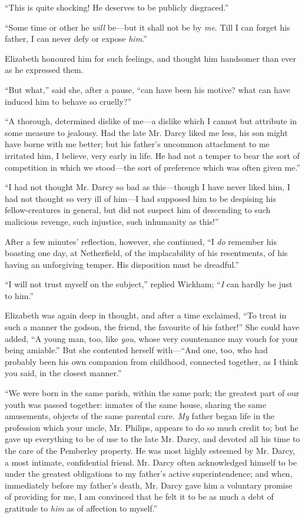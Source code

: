 ``This is quite shocking! He deserves to be publicly disgraced.''

``Some time or other he \textit{will} be---but it shall not be by \textit{me}. Till I can forget his father, I can never defy or expose \textit{him}.''

Elizabeth honoured him for such feelings, and thought him handsomer than ever as he expressed them.

``But what,'' said she, after a pause, ``can have been his motive? what can have induced him to behave so cruelly?''

``A thorough, determined dislike of me---a dislike which I cannot but attribute in some measure to jealousy. Had the late Mr. Darcy liked me less, his son might have borne with me better; but his father's uncommon attachment to me irritated him, I believe, very early in life. He had not a temper to bear the sort of competition in which we stood---the sort of preference which was often given me.''

``I had not thought Mr. Darcy so bad as this---though I have never liked him, I had not thought so very ill of him---I had supposed him to be despising his fellow-creatures in general, but did not suspect him of descending to such malicious revenge, such injustice, such inhumanity as this!''

After a few minutes' reflection, however, she continued, ``I \textit{do} remember his boasting one day, at Netherfield, of the implacability of his resentments, of his having an unforgiving temper. His disposition must be dreadful.''

``I will not trust myself on the subject,'' replied Wickham; ``\textit{I} can hardly be just to him.''

Elizabeth was again deep in thought, and after a time exclaimed, ``To treat in such a manner the godson, the friend, the favourite of his father!'' She could have added, ``A young man, too, like \textit{you}, whose very countenance may vouch for your being amiable.'' But she contented herself with---``And one, too, who had probably been his own companion from childhood, connected together, as I think you said, in the closest manner.''

``We were born in the same parish, within the same park; the greatest part of our youth was passed together: inmates of the same house, sharing the same amusements, objects of the same parental care. \textit{My} father began life in the profession which your uncle, Mr. Philips, appears to do so much credit to; but he gave up everything to be of use to the late Mr. Darcy, and devoted all his time to the care of the Pemberley property. He was most highly esteemed by Mr. Darcy, a most intimate, confidential friend. Mr. Darcy often acknowledged himself to be under the greatest obligations to my father's active superintendence; and when, immediately before my father's death, Mr. Darcy gave him a voluntary promise of providing for me, I am convinced that he felt it to be as much a debt of gratitude to \textit{him} as of affection to myself.''


